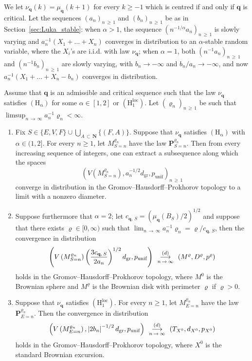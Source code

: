 \documentclass[AHL,Unicode,longabstracts,published]{cedram}
\newcommand{\ensembles}[1]{\mathbf{#1}}
\newcommand{\N}{\ensembles{N}}
\renewcommand{\P}{\ensembles{P}}
\newcommand{\1}{\ensembles{1}}
\newcommand{\q}{\mathbf{q}}
\renewcommand{\ge}{\geqslant}
\newcommand{\Bmap}{M}
\newcommand{\dBmap}{D}
\newcommand{\pBmap}{p}
\newcommand{\CRT}{T}
\newcommand{\dCRT}{d}
\newcommand{\pCRT}{p}
\newcommand{\Hrmloc}{\mathrm{(H_1^{loc})}}
\newcommand{\Hrmalp}{\mathrm{(H_\alpha)}}
\newcommand{\dgr}{d_{\mathrm{gr}}}
\newcommand{\pgr}{p_{\mathrm{unif}}}
\newcommand{\cvloi}[1][n]{\enskip\mathop{\longrightarrow}^{(d)}_{#1\,\to\, \infty}\enskip}
\begin{document}
We let $\nu_\q(k) = \mu_\q(k+1)$ for every $k \ge -1$ which is centred if and only if $\q$ is critical. Let the sequences $(a_n)_{n\,\ge\,1}$ and $(b_n)_{n\,\ge\,1}$ be as in Section~\ref{sec:Luka_stable}: when $\alpha>1$, the sequence $(n^{-1/\alpha} a_n)_{n\,\ge\,1}$ is slowly varying and $a_n^{-1} (X_1 + \dots + X_n)$ converges in distribution to an $\alpha$-stable random variable, where the $X_i$'s are i.i.d. with law $\nu_\q$; when $\alpha=1$, both $(n^{-1} a_n)_{n\,\ge\,1}$ and $(n^{-1} b_n)_{n\,\ge\,1}$ are slowly varying, with $b_n \to -\infty$ and $b_n / a_n \to -\infty$, and now $a_n^{-1} (X_1 + \dots + X_n - b_n)$ converges in distribution.



\begin{theo}\label{thm:Boltzmann}
Assume that $\q$ is an admissible and critical sequence such that the law $\nu_\q$ satisfies $\Hrmalp$ for some $\alpha \in [1, 2]$ or $\Hrmloc$. Let $(\varrho_n)_{n\,\ge\,1}$ be such that $\limsup_{n\,\to\,\infty} a_n^{-1} \varrho_n < \infty$.
\begin{enumerate}
\item\label{thm:Boltzmann_stable}
Fix $S \in \{E, V, F\} \cup \bigcup_{A\,\subset\,\N} \{(F,A)\}$. Suppose that $\nu_\q$ satisfies $\Hrmalp$ with $\alpha \in (1, 2]$. For every $n \ge 1$, let $M^{\varrho_n}_{S=n}$ have the law $\P^{\varrho_n}_{S=n}$. Then from every increasing sequence of integers, one can extract a subsequence along which the spaces
\[
\left(V\left(M^{\varrho_n}_{S=n}\right), a_n^{-1/2} \dgr, \pgr\right)_{n\,\ge\,1}
\]
converge in distribution in the Gromov--Hausdorff--Prokhorov topology to a limit with a nonzero diameter.

\item\label{thm:Boltzmann_Gaussien}
Suppose furthermore that $\alpha = 2$; let $c_{\q,\,S} = (\mu_\q(B_S) / 2)^{1/2}$ and suppose that there exists $\varrho \in [0, \infty)$ such that $\lim_{n\,\to\,\infty} a_n^{-1} \varrho_n = \varrho / c_{\q,\,S}$, then the convergence in distribution
\[
\left(V\left(M^{\varrho_n}_{S=n}\right) \left(\frac{3 c_{\q,\,S}}{2 a_n}\right)^{1/2} \dgr, \pgr\right) \cvloi \left(\Bmap^\varrho, \dBmap^\varrho, \pBmap^\varrho\right)
\]
holds in the Gromov--Hausdorff--Prokhorov topology, where $\Bmap^0$ is the Brownian sphere and $\Bmap^\varrho$ is the Brownian disk with perimeter $\varrho$ if $\varrho>0$.


\item\label{thm:Boltzmann_Cauchy_loc}
Suppose that $\nu_\q$ satisfies $\Hrmloc$. For every $n \ge 1$, let $M^{\varrho_n}_{E=n}$ have the law $\P^{\varrho_n}_{E=n}$. Then the convergence in distribution
\[
\left(V\left(M^{\varrho_n}_{E=n}\right), \left|2b_n\right|^{-1/2} \dgr, \pgr\right) \cvloi \left(\CRT_{X^0}, \dCRT_{X^0}, \pCRT_{X^0}\right)
\]
holds in the Gromov--Hausdorff--Prokhorov topology, where $X^0$ is the standard Brownian excursion.


\end{enumerate}
\end{theo}
\end{document}
